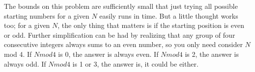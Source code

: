 
\noindent
The bounds on this problem are sufficiently small that just trying
all possible starting numbers for a given $N$ easily runs in time.
But a little thought works too; for a given $N$, the only thing that
matters is if the starting position is even or odd.  Further
simplification can be had by realizing that any group of four
consecutive integers always sums to an even number, so you only
need consider $N$ mod 4.  If $N mod 4$ is 0, the answer is always even.
If $N mod 4$ is 2, the answer is always odd.  If $N mod 4$ is 1 or 3, the
answer is, it could be either.
